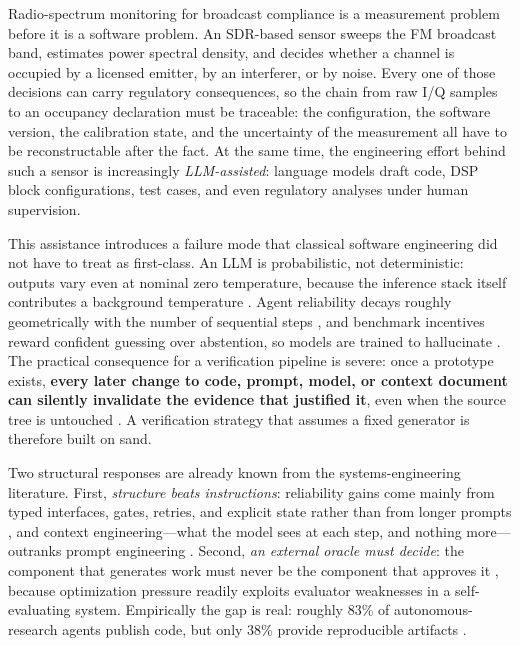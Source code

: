 \documentclass[11pt,a4paper]{article}
\begin{document}
Radio-spectrum monitoring for broadcast compliance is a measurement problem before it is a
software problem. An SDR-based sensor sweeps the FM broadcast band, estimates power spectral
density, and decides whether a channel is occupied by a licensed emitter, by an interferer, or by
noise. Every one of those decisions can carry regulatory consequences, so the chain from raw I/Q
samples to an occupancy declaration must be traceable: the configuration, the software version,
the calibration state, and the uncertainty of the measurement all have to be reconstructable
after the fact. At the same time, the engineering effort behind such a sensor is increasingly
\emph{LLM-assisted}: language models draft code, DSP block configurations, test cases, and even
regulatory analyses under human supervision.

This assistance introduces a failure mode that classical software engineering did not have to
treat as first-class. An LLM is probabilistic, not deterministic: outputs vary even at nominal
zero temperature, because the inference stack itself contributes a background temperature
\cite{pith2026}. Agent reliability decays roughly geometrically with the number of sequential
steps \cite{mittal2026}, and benchmark incentives reward confident guessing over abstention, so
models are trained to hallucinate \cite{kalai2026}. The practical consequence for a verification
pipeline is severe: once a prototype exists, \textbf{every later change to code, prompt, model,
or context document can silently invalidate the evidence that justified it}, even when the
source tree is untouched \cite{mittal2026,kalai2026}. A verification strategy that assumes a
fixed generator is therefore built on sand.

Two structural responses are already known from the systems-engineering literature. First,
\emph{structure beats instructions}: reliability gains come mainly from typed interfaces, gates,
retries, and explicit state rather than from longer prompts \cite{nerd2026}, and context
engineering---what the model sees at each step, and nothing more---outranks prompt engineering
\cite{anthropic2026}. Second, \emph{an external oracle must decide}: the component that generates
work must never be the component that approves it \cite{judge2026}, because optimization pressure
readily exploits evaluator weaknesses in a self-evaluating system. Empirically the gap is real:
roughly 83\% of autonomous-research agents publish code, but only 38\% provide reproducible
artifacts \cite{verifgap2026}.
\end{document}

